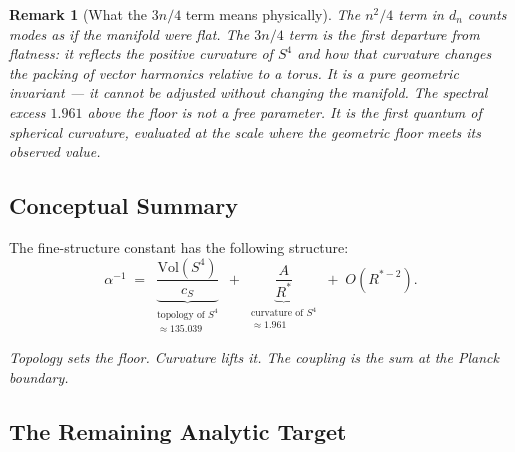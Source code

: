 \documentclass[12pt,a4paper]{article}
\newtheorem{remark}{Remark}[section]
\begin{document}
\begin{remark}[What the $3n/4$ term means physically]
The $n^2/4$ term in $d_n$ counts modes as if the
manifold were flat.
The $3n/4$ term is the first departure from flatness:
it reflects the positive curvature of $S^4$ and
how that curvature changes the packing of vector
harmonics relative to a torus.
It is a pure geometric invariant --- it cannot be
adjusted without changing the manifold.
The spectral excess $1.961$ above the floor is
not a free parameter.
It is the first quantum of spherical curvature,
evaluated at the scale where the geometric floor
meets its observed value.
\end{remark}

\subsection{Conceptual Summary}

The fine-structure constant has the following structure:
\begin{equation}
\boxed{
  \alpha^{-1}
  \;=\;
  \underbrace{\frac{\mathrm{Vol}(S^4)}{c_S}}_{\substack{
    \text{topology of }S^4 \\ \approx 135.039}}
  \;+\;
  \underbrace{\frac{A}{R^*}}_{\substack{
    \text{curvature of }S^4 \\ \approx 1.961}}
  \;+\;
  O(R^{*-2}).
}
\label{eq:decomp}
\end{equation}

\begin{center}
\textit{Topology sets the floor.
Curvature lifts it.
The coupling is the sum at the Planck boundary.}
\end{center}

\subsection{The Remaining Analytic Target}
\label{sec:O2gap}
\end{document}
